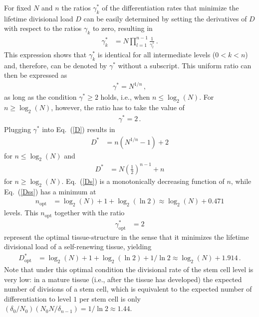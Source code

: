 \documentclass[aps,singlecolumn]{revtex4-1}
\begin{document}
For fixed $N$ and $n$ the ratios $\gamma_k^*$ of the differentiation
rates that minimize the
lifetime divisional load $D$ can be easily determined by setting the
derivatives of $D$ with respect to the ratios $\gamma_k$ to zero,
resulting in
%
\begin{align}
 \gamma_k^* &= N \prod_{l=1}^{n-1} \frac{1}{\gamma_l^*}
\, .
\end{align}
%
This expression shows that $\gamma_k^*$ is identical for all
intermediate levels ($0<k<n$) and, therefore, can be denoted by
$\gamma^*$ without a subscript. This uniform ratio can then be expressed as
%
\begin{align}
 \gamma^* = N^{1/n}
\, ,
\label{gs}
\end{align}
%
as long as the condition $\gamma^*\geq2$ holds, i.e., when $n\leq\log_2(N)$.
For $n\geq\log_2(N)$, however, the ratio has to take the value of
%
\begin{align}
 \gamma^* = 2
\, .
\label{gss}
\end{align}
%
Plugging $\gamma^*$ into Eq.~(\ref{D}) results in
%
\begin{align}
 D^* &=
 n \left( N^{1/n} - 1 \right) + 2
\label{Ds}
\end{align}
%
for $n\leq\log_2(N)$ and
%
\begin{align}
 D^* &=
 N \left( \frac{1}{2} \right)^{n-1} + n
\label{Dss}
\end{align}
%
for $n\geq\log_2(N)$.
Eq.~(\ref{Ds}) is a monotonically decreasing function of $n$, while
Eq.~(\ref{Dss}) has a minimum at
%
\begin{align}
 n_\textrm{opt} &=
 \log_2(N) + 1 + \log_2(\ln2) \approx
 \log_2(N) + 0.471
\label{nopt}
\end{align}
%
levels. This $n_\textrm{opt}$ together with the ratio
%
\begin{align}
 \gamma^*_\textrm{opt} &= 2
\label{gopt}
\end{align}
%
represent the optimal tissue-structure in the sense that it minimizes
the lifetime divisional load of a self-renewing tissue, yielding
%
\begin{align}
 D^*_\textrm{opt} &=
 \log_2(N) + 1 + \log_2(\ln2) + 1/\ln2 \approx
 \log_2(N) + 1.914
\, .
\end{align}
%
Note that under this optimal condition the divisional rate of the stem
cell level is very low: in a mature tissue (i.e., after the tissue has
developed) the expected number of divisions of a stem cell, which is
equivalent to the expected number of differentiation to level $1$ per
stem cell is only
$(\delta_0/N_0)(N_0 N/\delta_{n-1}) = 1/\ln2 \approx 1.44$.
\end{document}

